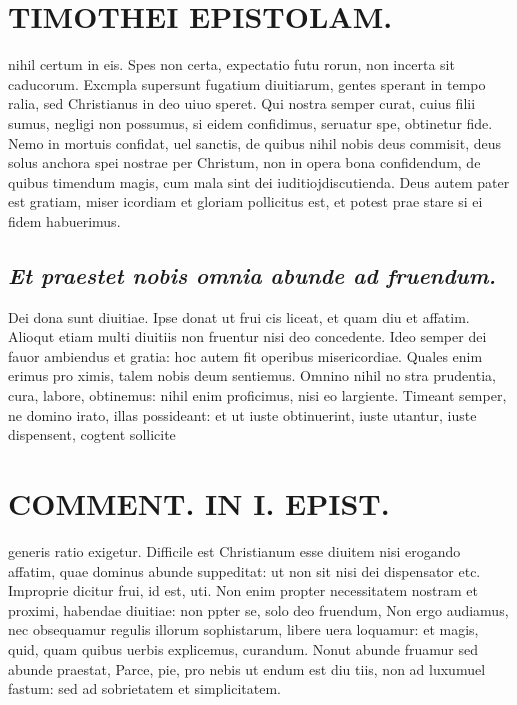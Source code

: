 \documentclass{article}
\begin{document}
\begin{pages}
\section*{TIMOTHEI EPISTOLAM. }
\marginpar{[ p.181 ]}\pstart nihil certum in eis. Spes non certa, expectatio futu rorun, non incerta sit caducorum. Excmpla supersunt fugatium diuitiarum, gentes sperant in tempo ralia, sed Christianus in deo uiuo speret. Qui nostra semper curat, cuius filii sumus, negligi non possumus, si eidem confidimus, seruatur spe, obtinetur fide. Nemo in mortuis confidat, uel sanctis, de quibus nihil nobis deus commisit, deus solus anchora spei nostrae per Christum, non in opera bona confidendum, de quibus timendum magis, cum mala sint dei iuditiojdiscutienda. Deus autem pater est gratiam, miser icordiam et gloriam pollicitus est, et potest prae stare si ei fidem habuerimus.  \pend
{}
{}
\subsection*{\textit{Et praestet nobis omnia abunde ad fruendum. }}\pstart Dei dona sunt diuitiae. Ipse donat ut frui cis liceat, et quam diu et affatim. Alioqut etiam multi diuitiis non fruentur nisi deo concedente. Ideo semper dei fauor ambiendus et gratia: hoc autem fit operibus misericordiae. Quales enim erimus pro ximis, talem nobis deum sentiemus. Omnino nihil no stra prudentia, cura, labore, obtinemus: nihil enim proficimus, nisi eo largiente. Timeant semper, ne domino irato, illas possideant: et ut iuste obtinuerint, iuste utantur, iuste dispensent, cogtent sollicite  \pend
\section*{COMMENT. IN I. EPIST. }
\marginpar{[ p.182 ]}\pstart generis ratio exigetur. Difficile est Christianum esse diuitem nisi erogando affatim, quae dominus abunde suppeditat: ut non sit nisi dei dispensator etc.  \pend\pstart Improprie dicitur frui, id est, uti. Non enim propter necessitatem nostram et proximi, habendae diuitiae: non ppter se, solo deo fruendum, Non ergo audiamus, nec obsequamur regulis illorum sophistarum, libere uera loquamur: et magis, quid, quam quibus uerbis explicemus, curandum. Nonut abunde fruamur sed abunde praestat, Parce, pie, pro nebis ut endum est diu tiis, non ad luxumuel fastum: sed ad sobrietatem et simplicitatem.  \pend
{}
{}

\end{pages}
\end{document}
